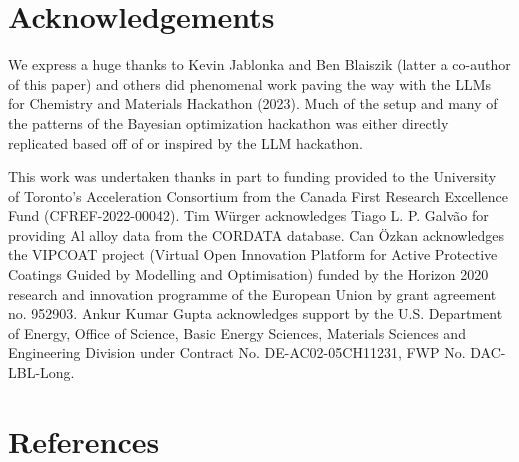 \documentclass[superscriptaddress, nofootinbib,  amsmath, amssymb, twocolumn]{revtex4-2} %
\begin{document}


\clearpage

\section*{Acknowledgements}

We express a huge thanks to Kevin Jablonka and Ben Blaiszik (latter a co-author of this paper) and others did phenomenal work paving the way with the LLMs for Chemistry and Materials Hackathon (2023). Much of the setup and many of the patterns of the Bayesian optimization hackathon was either directly replicated based off of or inspired by the LLM hackathon.

This work was undertaken thanks in part to funding provided to the University of Toronto’s Acceleration Consortium from the Canada First Research Excellence Fund (CFREF-2022-00042). Tim Würger acknowledges Tiago L. P. Galvão for providing Al alloy data from the CORDATA database. Can Özkan acknowledges the VIPCOAT project (Virtual Open Innovation Platform for Active Protective Coatings Guided by Modelling and Optimisation) funded by the Horizon 2020 research and innovation programme of the European Union by grant agreement no. 952903. Ankur Kumar Gupta acknowledges support by the U.S. Department of Energy, Office of Science, Basic Energy Sciences, Materials Sciences and Engineering Division under Contract No. DE-AC02-05CH11231, FWP No. DAC-LBL-Long.

\section*{References}


% 

\end{document}
